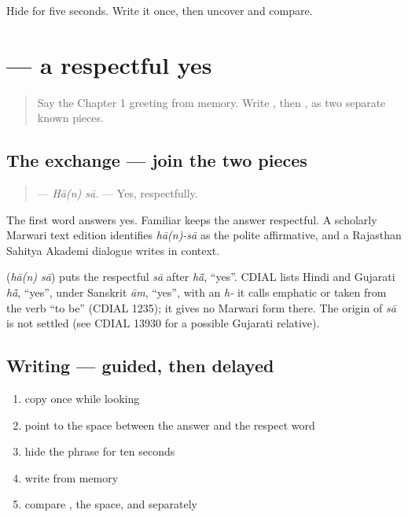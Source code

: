 \begin{tcolorbox}[breakable,colback=teal!4,colframe=teal!35!black,title={Before you move on}]
Hide \textbf{} for five seconds. Write it once, then uncover and compare.
\end{tcolorbox}
\section[\texorpdfstring{\mw{हां} \mw{सा} (hā(n) sā)}{हां सा (hā(n) sā)}]{  — a respectful yes}

\label{lesson:MW-C03-haan-saa}



\begin{quote}
Say the Chapter 1 greeting from memory. Write \textbf{}, then \textbf{}, as two separate known pieces.
\end{quote}

\subsection*{The exchange — join the two pieces}
\begin{quote}
\textbf{ } — \emph{Hā(n) sā.} — Yes, respectfully.
\end{quote}

The first word answers yes. Familiar \textbf{} keeps the answer respectful. A scholarly Marwari text edition identifies \emph{hā(n)-sā} as the polite affirmative, and a Rajasthan Sahitya Akademi dialogue writes \textbf{ } in context.

\begin{cousinweb}
\textbf{ } (\emph{hā(n) sā}) puts the respectful \emph{sā} after \emph{hā̃}, \textquotedblleft{}yes\textquotedblright{}. CDIAL lists Hindi and Gujarati \emph{hā̃}, \textquotedblleft{}yes\textquotedblright{}, under Sanskrit \emph{ām}, \textquotedblleft{}yes\textquotedblright{}, with an \emph{h-} it calls emphatic or taken from the verb \textquotedblleft{}to be\textquotedblright{} (CDIAL 1235); it gives no Marwari form there. The origin of \emph{sā} is not settled (see CDIAL 13930 for a possible Gujarati relative).
\end{cousinweb}

\subsection*{Writing — guided, then delayed}
\begin{enumerate}
\raggedright
  \item copy \textbf{ } once while looking
  \item point to the space between the answer and the respect word
  \item hide the phrase for ten seconds
  \item write \textbf{ } from memory
  \item compare \textbf{}, the space, and \textbf{} separately
\end{enumerate}

